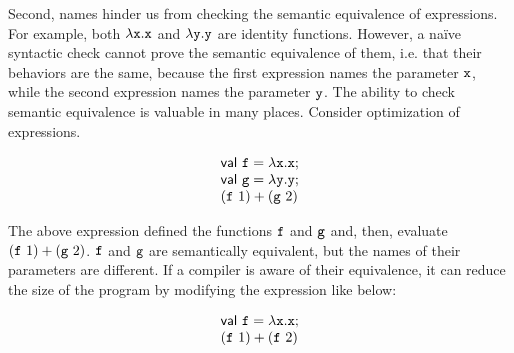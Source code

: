 
Second, names hinder us from checking the semantic equivalence of expressions.
For example, both $\lambda \texttt{x}.\texttt{x}$ and $\lambda \texttt{y}.\texttt{y}$ are
identity functions. However, a naïve syntactic check cannot prove the semantic
equivalence of them, i.e. that their behaviors are the same, because the first
expression names the parameter $\texttt{x}$, while the second expression names the
parameter $\texttt{y}$. The ability to check semantic equivalence is valuable in many
places. Consider optimization of expressions.

\[
\begin{array}{l}
\textsf{val}\ \texttt{f}=\lambda \texttt{x}.\texttt{x}; \\
\textsf{val}\ \texttt{g}=\lambda \texttt{y}.\texttt{y}; \\
(\texttt{f}\ 1)+(\texttt{g}\ 2) \\
\end{array}
\]

The above expression defined the functions $\texttt{f}$ and $\texttt{g}$ and, then,
evaluate $(\texttt{f}\ 1)+(\texttt{g}\ 2)$. $\texttt{f}$ and $\texttt{g}$ are semantically
equivalent, but the names of their parameters are different. If a compiler is
aware of their equivalence, it can reduce the size of the program by
modifying the expression like below:

\[
\begin{array}{l}
\textsf{val}\ \texttt{f}=\lambda \texttt{x}.\texttt{x}; \\
(\texttt{f}\ 1)+(\texttt{f}\ 2) \\
\end{array}
\]


